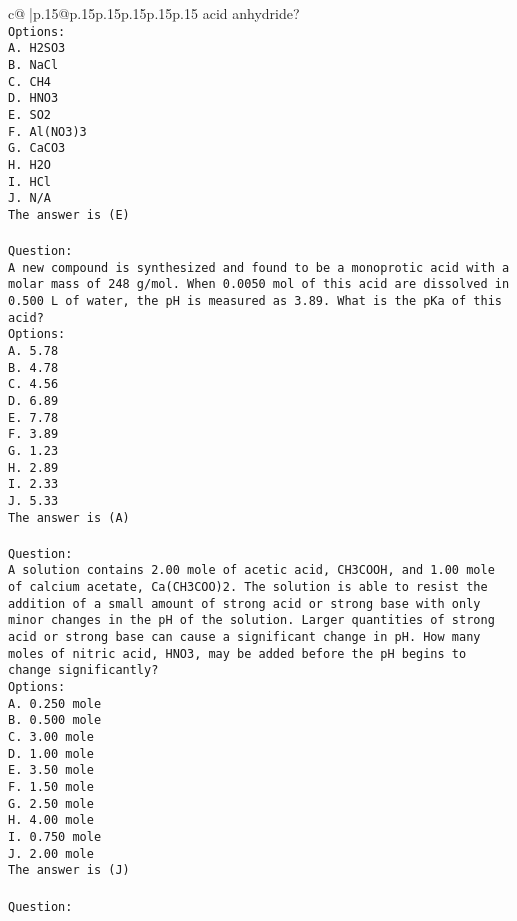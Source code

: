 \documentclass{article}
\begin{document}
{\begin{supertabular}{c@{$\;$}|p{.15\linewidth}@{}p{.15\linewidth}p{.15\linewidth}p{.15\linewidth}p{.15\linewidth}p{.15\linewidth}}
{{{acid anhydride?\\ \tt Options:\\ \tt A. H2SO3\\ \tt B. NaCl\\ \tt C. CH4\\ \tt D. HNO3\\ \tt E. SO2\\ \tt F. Al(NO3)3\\ \tt G. CaCO3\\ \tt H. H2O\\ \tt I. HCl\\ \tt J. N/A\\ \tt The answer is (E)\\ \tt \\ \tt Question:\\ \tt A new compound is synthesized and found to be a monoprotic acid with a molar mass of 248 g/mol. When 0.0050 mol of this acid are dissolved in 0.500 L of water, the pH is measured as 3.89. What is the pKa of this acid?\\ \tt Options:\\ \tt A. 5.78\\ \tt B. 4.78\\ \tt C. 4.56\\ \tt D. 6.89\\ \tt E. 7.78\\ \tt F. 3.89\\ \tt G. 1.23\\ \tt H. 2.89\\ \tt I. 2.33\\ \tt J. 5.33\\ \tt The answer is (A)\\ \tt \\ \tt Question:\\ \tt A solution contains 2.00 mole of acetic acid, CH3COOH, and 1.00 mole of calcium acetate, Ca(CH3COO)2. The solution is able to resist the addition of a small amount of strong acid or strong base with only minor changes in the pH of the solution. Larger quantities of strong acid or strong base can cause a significant change in pH. How many moles of nitric acid, HNO3, may be added before the pH begins to change significantly?\\ \tt Options:\\ \tt A. 0.250 mole\\ \tt B. 0.500 mole\\ \tt C. 3.00 mole\\ \tt D. 1.00 mole\\ \tt E. 3.50 mole\\ \tt F. 1.50 mole\\ \tt G. 2.50 mole\\ \tt H. 4.00 mole\\ \tt I. 0.750 mole\\ \tt J. 2.00 mole\\ \tt The answer is (J)\\ \tt \\ \tt Question:\\ \tt }}}
\end{supertabular}}
\end{document}
